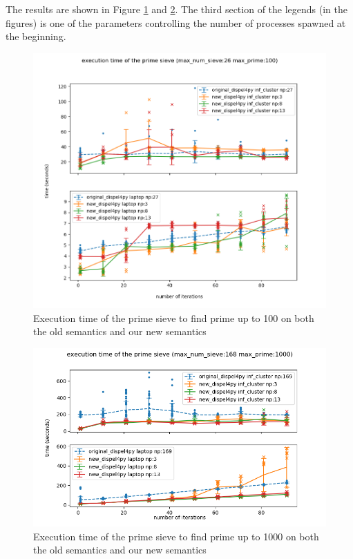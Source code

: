 The results are shown in Figure \ref{fig:sieve_opt_100} and \ref{fig:sieve_opt_1000}. The third section of the legends (in the figures) is one of the parameters controlling the number of processes spawned at the beginning.

\begin{figure}[h]
\centering
    \includegraphics[width=1\textwidth]{figures/sieve_opt1_100}
\caption{Execution time of the prime sieve to find prime up to 100 on both the old semantics and our new semantics}
\label{fig:sieve_opt_100}
\end{figure}

\begin{figure}[h]
\centering
    \includegraphics[width=1\textwidth]{figures/sieve_opt1_1000}
\caption{Execution time of the prime sieve to find prime up to 1000 on both the old semantics and our new semantics}
\label{fig:sieve_opt_1000}
\end{figure}

